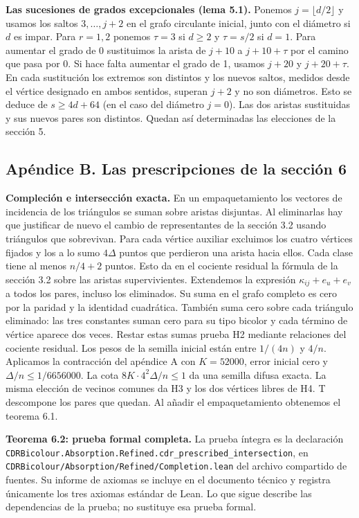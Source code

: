 \documentclass[spanish,11pt,a4paper]{article}
\begin{document}
\textbf{Las sucesiones de grados excepcionales (lema 5.1).} Ponemos \(j=\lfloor d/2\rfloor\) y usamos los saltos \(3,\ldots,j+2\) en el grafo circulante inicial, junto con el diámetro si \(d\) es impar. Para \(r=1,2\) ponemos \(\tau=3\) si \(d\ge2\) y \(\tau=s/2\) si \(d=1\). Para aumentar el grado de 0 sustituimos la arista de \(j+10\) a \(j+10+\tau\) por el camino que pasa por 0. Si hace falta aumentar el grado de 1, usamos \(j+20\) y \(j+20+\tau\). En cada sustitución los extremos son distintos y los nuevos saltos, medidos desde el vértice designado en ambos sentidos, superan \(j+2\) y no son diámetros. Esto se deduce de \(s\ge4d+64\) (en el caso del diámetro \(j=0\)). Las dos aristas sustituidas y sus nuevos pares son distintos. Quedan así determinadas las elecciones de la sección 5.

\subsection{Apéndice B. Las prescripciones de la sección 6}\label{apuxe9ndice-b.-las-prescripciones-de-la-secciuxf3n-6}

\textbf{Compleción e intersección exacta.} En un empaquetamiento los vectores de incidencia de los triángulos se suman sobre aristas disjuntas. Al eliminarlas hay que justificar de nuevo el cambio de representantes de la sección 3.2 usando triángulos que sobrevivan. Para cada vértice auxiliar excluimos los cuatro vértices fijados y los a lo sumo \(4\Delta\) puntos que perdieron una arista hacia ellos. Cada clase tiene al menos \(n/4+2\) puntos. Esto da en el cociente residual la fórmula de la sección 3.2 sobre las aristas supervivientes. Extendemos la expresión \(\kappa_{ij}+e_u+e_v\) a todos los pares, incluso los eliminados. Su suma en el grafo completo es cero por la paridad y la identidad cuadrática. También suma cero sobre cada triángulo eliminado: las tres constantes suman cero para su tipo bicolor y cada término de vértice aparece dos veces. Restar estas sumas prueba H2 mediante relaciones del cociente residual. Los pesos de la semilla inicial están entre \(1/(4n)\) y \(4/n\). Aplicamos la contracción del apéndice A con \(K=52000\), error inicial cero y \(\Delta/n\le1/6656000\). La cota \(8K\cdot4^2\Delta/n\le1\) da una semilla difusa exacta. La misma elección de vecinos comunes da H3 y los dos vértices libres de H4. T descompone los pares que quedan. Al añadir el empaquetamiento obtenemos el teorema 6.1.

\textbf{Teorema 6.2: prueba formal completa.} La prueba íntegra es la declaración \texttt{CDRBicolour.\allowbreak{}Absorption.\allowbreak{}Refined.\allowbreak{}cdr\_\allowbreak{}prescribed\_\allowbreak{}intersection}, en \texttt{CDRBicolour/\allowbreak{}Absorption/\allowbreak{}Refined/\allowbreak{}Completion.\allowbreak{}lean} del archivo compartido de fuentes. Su informe de axiomas se incluye en el documento técnico y registra únicamente los tres axiomas estándar de Lean. Lo que sigue describe las dependencias de la prueba; no sustituye esa prueba formal.
\end{document}
